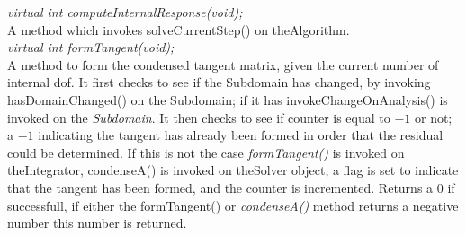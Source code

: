 {\em     virtual int  computeInternalResponse(void);}\\
A method which invokes solveCurrentStep() on \p theAlgorithm.  \\

{\em     virtual int  formTangent(void);}\\
A method to form the condensed tangent matrix, given the current
number of internal dof. It first checks to see if the Subdomain has
changed, by  invoking hasDomainChanged() on the Subdomain; if it
has invokeChangeOnAnalysis() is invoked on the {\em
Subdomain}. It then checks to see if \p counter is equal to $-1$ or
not; a $-1$ indicating the tangent has already been formed in order
that the residual could be determined. If this is not the case {\em
formTangent()} is invoked on \p theIntegrator, condenseA() is
invoked on \p theSolver object, a flag is set to indicate that the
tangent has been formed, and the \p counter is incremented. Returns
a $0$ if successfull, if either the formTangent() or {\em
condenseA()} method returns a negative number this number is
returned. \\  

